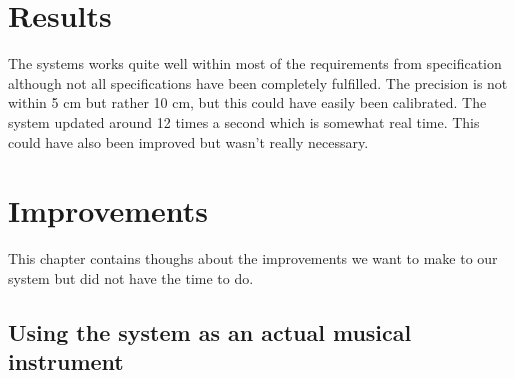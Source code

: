 \chapter{Results}
The systems works quite well within most of the requirements from specification although not all specifications have been completely fulfilled. The precision is not within 5 cm but rather 10 cm, but this could have easily been calibrated. The system updated around 12 times a second which is somewhat real time. This could have also been improved but wasn't really necessary.












\chapter{Improvements}
This chapter contains thoughs about the improvements we want to make to our system but did not have the time to do.
\section{Using the system as an actual musical instrument}
